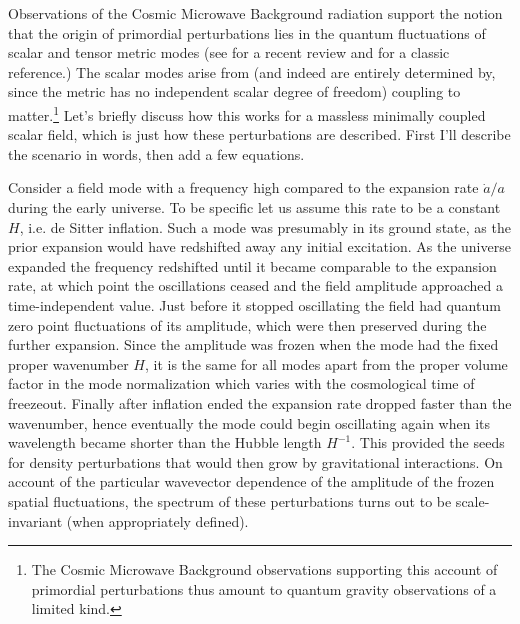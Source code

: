\documentclass[12pt]{article}
\begin{document}
Observations of the Cosmic Microwave Background
radiation support the notion that the origin of 
primordial perturbations lies in the quantum 
fluctuations of scalar and tensor metric modes
(see \cite{Brandenberger:2003vk} for a recent review
and \cite{Mukhanov:1990me} for a classic reference.)
The scalar modes arise from (and indeed
are entirely determined by, since the metric has no 
independent scalar degree of freedom) coupling to 
matter.\footnote{The Cosmic Microwave Background 
observations supporting this account of primordial 
perturbations thus amount
to quantum gravity observations of a limited kind.} Let's
briefly discuss how this works for a massless
minimally coupled scalar field,
which is just how these perturbations are described.
First I'll describe the scenario in words, then add a few
equations.

Consider a field mode with a frequency
high compared to the expansion rate $\dot{a}/a$
during the early universe. To be specific let us 
assume this rate to be a constant $H$, i.e. de Sitter
inflation. Such a mode was
presumably in its ground state,  as the prior 
expansion would have redshifted away any 
initial excitation. 
As the universe expanded the
frequency redshifted until it became comparable to the 
expansion rate, at which point the oscillations 
ceased and the field amplitude approached a time-independent
value. Just before it stopped oscillating the field
had quantum zero point fluctuations of its amplitude,
which were then preserved during the further expansion.
Since the amplitude was frozen when the mode had the 
fixed proper wavenumber $H$, it is the same for all modes
apart from the proper volume factor in the mode normalization
which varies with the cosmological time of freezeout.  
Finally after inflation ended the expansion rate dropped 
faster than the wavenumber, hence eventually the 
mode could begin oscillating again when its wavelength
became shorter than the Hubble length $H^{-1}$. 
This provided the seeds
for density perturbations that would then grow by gravitational
interactions. On account of the particular wavevector dependence 
of the amplitude of the frozen spatial fluctuations, the spectrum of 
these perturbations turns out to be scale-invariant (when
appropriately defined).
\end{document}
